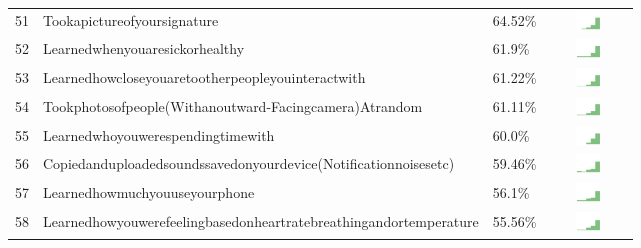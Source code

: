 \documentclass[a4paper,12pt]{article}
\begin{document}
\begin{longtable}{| p{0.5cm} | p{7cm} | p{1cm} | c |}
51 & Tookapictureofyoursignature & 64.52\% & \includegraphics[width = 2cm, height = 0.5cm]{tookapictureofyoursignaturePUBLIC} \\  
52 & Learnedwhenyouaresickorhealthy & 61.9\% & \includegraphics[width = 2cm, height = 0.5cm]{learnedwhenyouaresickorhealthyPUBLIC} \\  
53 & Learnedhowcloseyouaretootherpeopleyouinteractwith & 61.22\% & \includegraphics[width = 2cm, height = 0.5cm]{learnedhowcloseyouaretootherpeopleyouinteractwithPUBLIC} \\  
54 & Tookphotosofpeople(Withanoutward-Facingcamera)Atrandom & 61.11\% & \includegraphics[width = 2cm, height = 0.5cm]{tookphotosofpeople(withanoutward-facingcamera)atrandomPUBLIC} \\  
55 & Learnedwhoyouwerespendingtimewith & 60.0\% & \includegraphics[width = 2cm, height = 0.5cm]{learnedwhoyouwerespendingtimewithPUBLIC} \\  
56 & Copiedanduploadedsoundssavedonyourdevice(Notificationnoisesetc) & 59.46\% & \includegraphics[width = 2cm, height = 0.5cm]{copiedanduploadedsoundssavedonyourdevice(notificationnoisesetc)PUBLIC} \\  
57 & Learnedhowmuchyouuseyourphone & 56.1\% & \includegraphics[width = 2cm, height = 0.5cm]{learnedhowmuchyouuseyourphonePUBLIC} \\  
58 & Learnedhowyouwerefeelingbasedonheartratebreathingandortemperature & 55.56\% & \includegraphics[width = 2cm, height = 0.5cm]{learnedhowyouwerefeelingbasedonheartratebreathingandortemperaturePUBLIC} \\  

\end{longtable}
\end{document}
